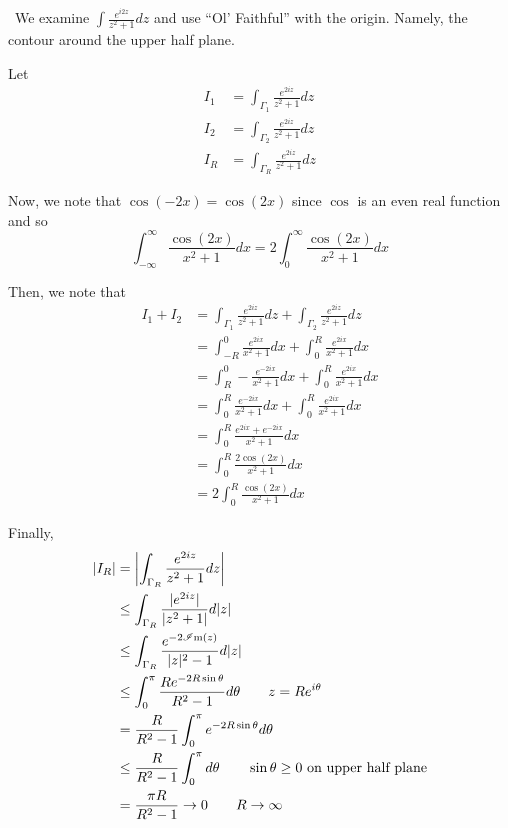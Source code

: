 \documentclass[12pt]{Qual}
\begin{document}
\begin{solution}$\,$
We examine $\displaystyle\int\frac{e^{i2z}}{z^2+1}dz$ and use ``Ol' Faithful'' with the origin. Namely, the contour around the upper half plane.

\begin{center}
\end{center}

Let \begin{align*}
    I_1&=\int_{\Gamma_1}\frac{e^{2iz}}{z^2+1}dz\\
    I_2&=\int_{\Gamma_2}\frac{e^{2iz}}{z^2+1}dz\\
    I_R&=\int_{\Gamma_R}\frac{e^{2iz}}{z^2+1}dz
\end{align*}

Now, we note that $\cos(-2x)=\cos(2x)$ since $\cos$ is an even real function and so $$\int_{-\infty}^\infty\frac{\cos(2x)}{x^2+1}dx=2\int_0^\infty\frac{\cos(2x)}{x^2+1}dx$$

Then, we note that \begin{align*}
    I_1+I_2&=\int_{\Gamma_1}\frac{e^{2iz}}{z^2+1}dz+\int_{\Gamma_2}\frac{e^{2iz}}{z^2+1}dz\\
    &=\int_{-R}^0\frac{e^{2ix}}{x^2+1}dx+\int_0^R\frac{e^{2ix}}{x^2+1}dx\\
    &=\int_R^0-\frac{e^{-2ix}}{x^2+1}dx+\int_0^R\frac{e^{2ix}}{x^2+1}dx\\
    &=\int_0^R\frac{e^{-2ix}}{x^2+1}dx+\int_0^R\frac{e^{2ix}}{x^2+1}dx\\
    &=\int_0^R\frac{e^{2ix}+e^{-2ix}}{x^2+1}dx\\
    &=\int_0^R\frac{2\cos(2x)}{x^2+1}dx\\
    &=2\int_0^R\frac{\cos(2x)}{x^2+1}dx
\end{align*}

Finally, \begin{align*}
    |I_R|&=\left|\int_{\Gamma_R}\frac{e^{2iz}}{z^2+1}dz\right|\\
    &\le\int_{\Gamma_R}\frac{|e^{2iz}|}{|z^2+1|}d|z|\\
    &\le\int_{\Gamma_R}\frac{e^{-2\mathscr{I}\text{m}(z)}}{|z|^2-1}d|z|\\
    &\le\int_0^\pi\frac{Re^{-2R\sin\theta}}{R^2-1}d\theta \qquad z=Re^{i\theta}\\
    &=\frac{R}{R^2-1}\int_0^\pi e^{-2R\sin\theta} d\theta\\
    &\le \frac{R}{R^2-1}\int_0^\pi d\theta\qquad \sin\theta\ge 0\text{ on upper half plane}\\
    &=\frac{\pi R}{R^2-1}\to0\qquad R\to\infty
\end{align*}


\end{solution}
\end{document}
